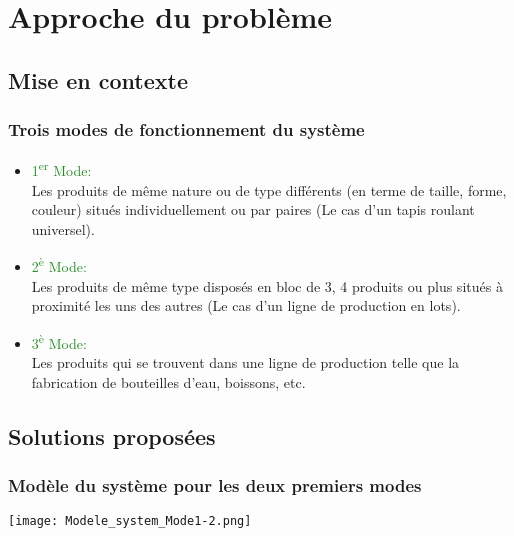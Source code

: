\documentclass{beamer}
\begin{document}
\section{Approche du problème}

\subsection{Mise en contexte} %

\begin{frame}
\frametitle{Trois modes de fonctionnement du système}
\begin{itemize}
\item \textcolor{forestgreen}{\Large{1\textsuperscript{er} Mode:}}\\
Les produits de même nature ou de type différents (en terme de taille, forme, couleur) situés individuellement ou par paires (Le cas d'un tapis roulant universel). 
\bigskip
\item \textcolor{forestgreen}{\Large{2\textsuperscript{è} Mode:}}\\
Les produits de même type disposés en bloc de 3, 4 produits ou plus
situés à proximité les uns des autres (Le cas d'un ligne de production en lots). 
\bigskip
\item \textcolor{forestgreen}{\Large{3\textsuperscript{è} Mode:}}\\
Les produits qui se trouvent dans une ligne de production telle que la fabrication de bouteilles d'eau, boissons, etc.
\end{itemize}
\end{frame}


\subsection{Solutions proposées} %

\begin{frame}
\frametitle{Modèle du système pour les deux premiers modes}
\centering
    \texttt{[image: Modele\_system\_Mode1-2.png]}
\end{frame}
\end{document}
